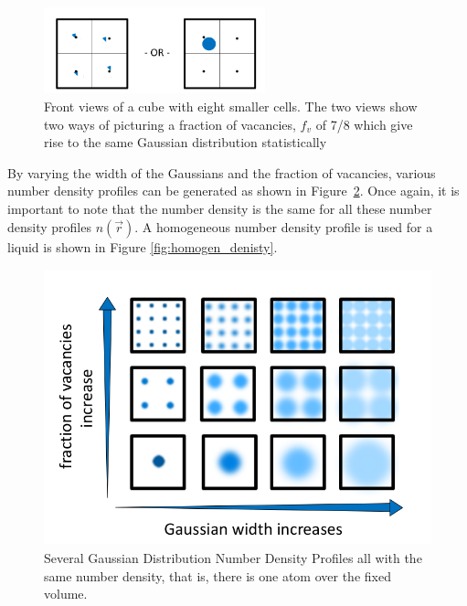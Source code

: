 \documentclass[double,12pt]{beavtex}
\begin{document}
\begin{figure}[h!]
    \centering
    \includegraphics[height=2.5cm]{SameStatPic.png}
    \caption{Front views of a cube with eight smaller cells. The two views 
    show two ways of picturing a fraction of vacancies, $f_v$ of 7/8 which 
    give rise to the same Gaussian distribution statistically}
    \label{fig:SameStatPic}
  \end{figure} 

By varying the width of the Gaussians and the fraction of vacancies, various
number density profiles can be generated as shown in Figure~\ref{fig:Ensemble_vary}.
Once again, it is important to note that the number density is the same 
for all these number density profiles $n(\vec{r})$. 
A homogeneous number density profile is used for a liquid is shown in Figure \ref{fig:homogen_denisty}.

\begin{figure}[h!]
    \centering
    \includegraphics[height=8cm]{VaryWidthandVacancies.png}
    \caption{Several Gaussian Distribution Number Density Profiles all 
    with the same number density, that is, there is one atom over the fixed volume.}
    \label{fig:Ensemble_vary}
  \end{figure}  
\end{document}
